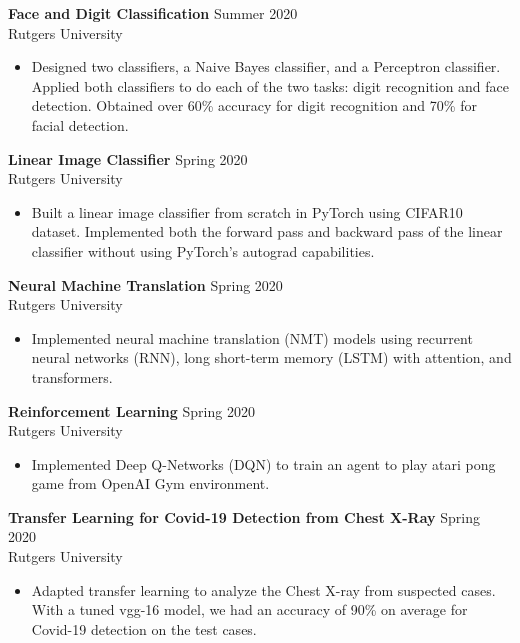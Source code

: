 \documentclass{article}
\begin{document}
\noindent \textbf{Face and Digit Classification}
\hfill{Summer 2020}\\
Rutgers University
\begin{itemize}
  \itemsep0em
  \item Designed two classifiers, a Naive Bayes classifier, and a Perceptron classifier. Applied both classifiers to do each of the two tasks: digit recognition and face detection. Obtained over 60\% accuracy for digit recognition and 70\% for facial detection.
\end{itemize}

\noindent \textbf{Linear Image Classifier}
\hfill{Spring 2020}\\
Rutgers University
\begin{itemize}
  \itemsep0em
  \item Built a linear image classifier from scratch in PyTorch using CIFAR10 dataset. Implemented both the forward pass and backward pass of the linear classifier without using PyTorch's autograd capabilities.
\end{itemize}

\noindent \textbf{Neural Machine Translation}
\hfill{Spring 2020}\\
Rutgers University
\begin{itemize}
  \itemsep0em
  \item Implemented neural machine translation (NMT) models using recurrent neural networks (RNN), long short-term memory (LSTM) with attention, and transformers.
\end{itemize}

\noindent \textbf{Reinforcement Learning}
\hfill{Spring 2020}\\
Rutgers University
\begin{itemize}
  \itemsep0em
  \item Implemented Deep Q-Networks (DQN) to train an agent to play atari pong game from OpenAI Gym environment.
\end{itemize}

\noindent \textbf{Transfer Learning for Covid-19 Detection from Chest X-Ray}
\hfill{Spring 2020}\\
Rutgers University
\begin{itemize}
  \itemsep0em
  \item  Adapted transfer learning to analyze the Chest X-ray from suspected cases.  With a tuned vgg-16 model, we had an accuracy of 90\% on average for Covid-19 detection on the test cases.
\end{itemize}
\end{document}
